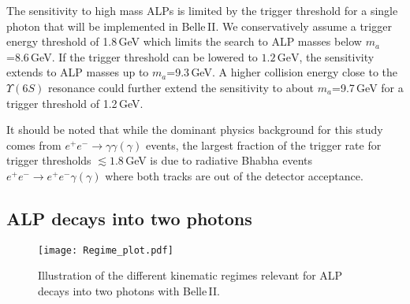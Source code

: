 \documentclass[11pt,a4paper]{article}
\def \belletwo {Belle\,II\xspace}
\begin{document}
The sensitivity to high mass ALPs is limited by the trigger threshold for a single photon that will be implemented in \belletwo. We conservatively assume a trigger energy threshold of 1.8\,GeV which limits the search to ALP masses below $m_{a}$=8.6\,GeV. If the trigger threshold can be lowered to $1.2\,\text{GeV}$, the sensitivity extends to ALP masses up to $m_{a}$=9.3\,GeV. A higher collision energy close to the $\Upsilon(6S)$ resonance could further extend the sensitivity to about  $m_{a}$=9.7\,GeV for a trigger threshold of 1.2\,GeV. 

It should be noted that while the dominant physics background for this study comes from $e^+e^-\to \gamma\gamma(\gamma)$ events, the largest fraction of the trigger rate for trigger thresholds $\lesssim 1.8$\,GeV is due to radiative Bhabha events $e^+e^-\to e^+e^-\gamma(\gamma)$  where both tracks are out of the detector acceptance. 

\subsection{ALP decays into two photons}

\begin{figure}
\centering
\texttt{[image: Regime\_plot.pdf]}
\caption{\label{fig:regimes} Illustration of the different kinematic regimes relevant for ALP decays into two photons with \belletwo.}
\end{figure}
\end{document}
